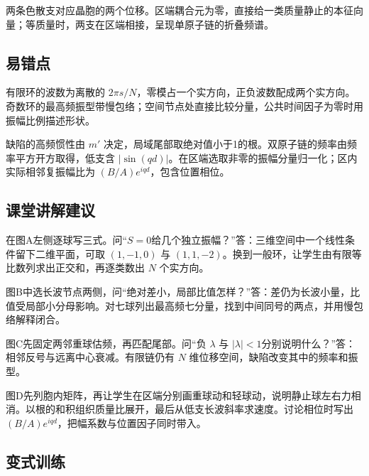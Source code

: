 \documentclass[UTF8,fontset=fandol,a4paper,11pt]{ctexart}
\begin{document}
两条色散支对应晶胞的两个位移。区端耦合元为零，直接给一类质量静止的本征向量；等质量时，两支在区端相接，呈现单原子链的折叠频谱。




\subsection*{易错点}

有限环的波数为离散的 $2\pi s/N$，零模占一个实方向，正负波数配成两个实方向。奇数环的最高频振型带慢包络；空间节点处直接比较分量，公共时间因子为零时用振幅比例描述形状。

缺陷的高频惯性由 $m'$ 决定，局域尾部取绝对值小于1的根。双原子链的频率由频率平方开方取得，低支含 $|\sin(qd)|$。在区端选取非零的振幅分量归一化；区内实际相邻复振幅比为 $(B/A)e^{iqd}$，包含位置相位。




\subsection*{课堂讲解建议}

在图A左侧逐球写三式。问“$S=0$给几个独立振幅？”答：三维空间中一个线性条件留下二维平面，可取 $(1,-1,0)$ 与 $(1,1,-2)$。换到一般环，让学生由有限等比数列求出正交和，再逐类数出 $N$ 个实方向。

图B中选长波节点两侧，问“绝对差小，局部比值怎样？”答：差仍为长波小量，比值受局部小分母影响。对七球列出最高频七分量，找到中间同号的两点，并用慢包络解释闭合。

图C先固定两邻重球估频，再匹配尾部。问“负 $\lambda$ 与 $|\lambda|<1$分别说明什么？”答：相邻反号与远离中心衰减。有限链仍有 $N$ 维位移空间，缺陷改变其中的频率和振型。

图D先列胞内矩阵，再让学生在区端分别画重球动和轻球动，说明静止球左右力相消。以根的和积组织质量比展开，最后从低支长波斜率求速度。讨论相位时写出 $(B/A)e^{iqd}$，把幅系数与位置因子同时带入。




\subsection*{变式训练}
\end{document}
